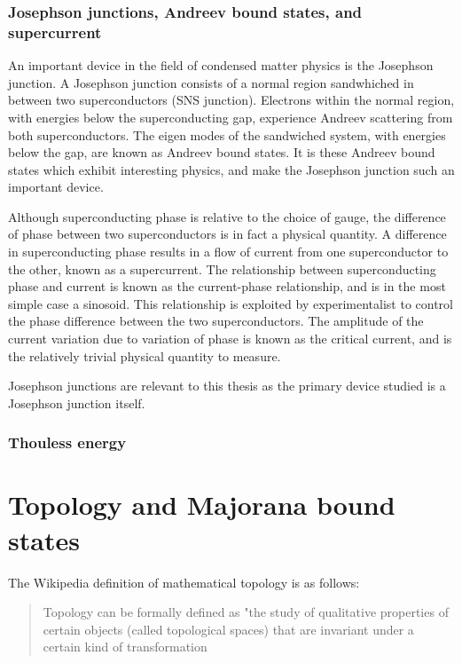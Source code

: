 		\subsubsection{Josephson junctions, Andreev bound states, and supercurrent}
			An important device in the field of condensed matter physics is the Josephson junction.
			A Josephson junction consists of a normal region sandwhiched in between two superconductors (SNS junction).
			Electrons within the normal region, with energies below the superconducting gap, experience Andreev scattering from both superconductors.
			The eigen modes of the sandwiched system, with energies below the gap, are known as Andreev bound states.
			It is these Andreev bound states which exhibit interesting physics, and make the Josephson junction such an important device.

			Although superconducting phase is relative to the choice of gauge, the difference of phase between two superconductors is in fact a physical quantity.
			A difference in superconducting phase results in a flow of current from one superconductor to the other, known as a supercurrent.
			The relationship between superconducting phase and current is known as the current-phase relationship, and is in the most simple case a sinosoid.
			This relationship is exploited by experimentalist to control the phase difference between the two superconductors.
			The amplitude of the current variation due to variation of phase is known as the critical current, and is the relatively trivial physical quantity to measure.
			
			Josephson junctions are relevant to this thesis as the primary device studied is a Josephson junction itself.

		\subsubsection{Thouless energy}



\section{Topology and Majorana bound states}

	The Wikipedia definition of mathematical topology is as follows:
	
	\begin{quote}Topology can be formally defined as "the study of qualitative properties of certain objects (called topological spaces) that are invariant under a certain kind of transformation
	\cite{noauthor_topology_2018}
	\end{quote}

